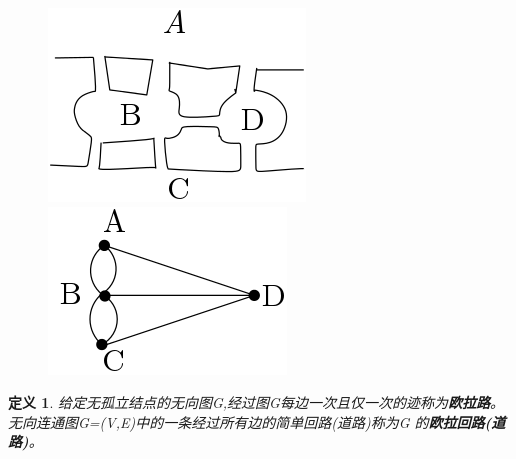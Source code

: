 \documentclass[11pt,a4paper,openany]{book}
\newtheorem{defination}{\textbf{定义}}[section]
\begin{document}
\begin{figure}[h]
  \centering
  \vspace{-10pt}
  \begin{minipage}[!ht]{.35\linewidth}
  \includegraphics[width=1.0\linewidth]{2.8.png}
  \caption{}
  \end{minipage}
  \begin{minipage}[!ht]{.35\linewidth}
   \includegraphics[width=1.0\linewidth]{2.9.png}
  \caption{}
  \end{minipage}
  \vspace{-25pt}
\end{figure}
\begin{defination}\K
给定无孤立结点的无向图G,经过图G每边一次且仅一次的迹称为\textbf{欧拉路}。无向连通图G=(V,E)中的一条经过所有边的简单回路(道路)称为G 的\textbf{欧拉回路(道路)}。
\end{defination}
\end{document}
